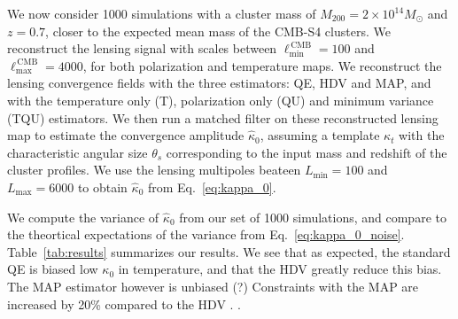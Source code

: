 \documentclass[prd, superscriptaddress, tightenlines, longbibliography, nofootinbib, eqsecnum, amsfonts, amsmath, floatfix, twocolumn, notitlepage]{revtex4-2}
\newcommand{\LL}[1]{{\color{orange}{LL: #1}}}
\begin{document}
We now consider 1000 simulations with a cluster mass of $M_{200} = 2 \times 10^{14} M_{\odot}$ and $z=0.7$, closer to the expected mean mass of the CMB-S4 clusters. We reconstruct the lensing signal with scales between  $\ell_{\text{min}}^{\, \text{CMB}}=100$ and $\ell_{\text{max}}^{\, \text{CMB}} = 4000$, for both polarization and temperature maps.
We reconstruct the lensing convergence fields with the three estimators: QE, HDV and MAP, and with the temperature only (T), polarization only (QU) and minimum variance (TQU) estimators. We then run a matched filter on these reconstructed lensing map to estimate the convergence amplitude $\hat \kappa_0$, assuming a template $\kappa_t$ with the characteristic angular size $\theta_s$ corresponding to the input mass and redshift of the cluster profiles.
We use the lensing multipoles beateen $L_{\text{min}}=100$ and $L_{\text{max}}=6000$ to obtain $\hat \kappa_0$ from Eq.~\ref{eq:kappa_0}.
\LL{Sayan mention here that the noise is obtained from the sims}

We compute the variance of $\hat \kappa_0$ from our set of 1000 simulations, and compare to the theortical expectations of the variance from Eq.~\ref{eq:kappa_0_noise}.
Table~\ref{tab:results} summarizes our results.
We see that as expected, the standard QE is biased low $\kappa_0$ in temperature, and that the HDV greatly reduce this bias.
The MAP estimator however is unbiased (?)
Constraints with the MAP are increased by 20\% compared to the HDV
\LL{to develop given the last version of the Table}. \LL{Give bias in terms of number of sigma}. 
\end{document}
